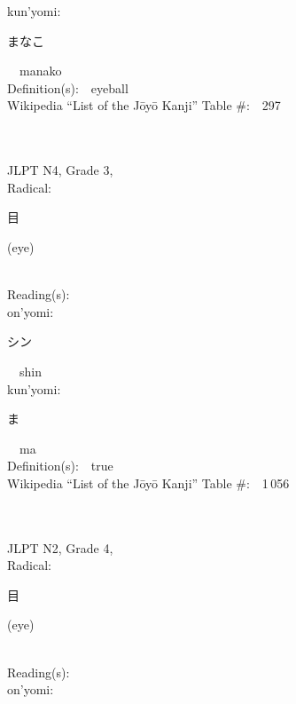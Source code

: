 \begin{multicols}{2}
{\hspace*{1em}}kun'yomi:\ \ \\
{\hspace*{2em}}{\begin{CJK}{UTF8}{min} まなこ \end{CJK}}\ \ manako\ \ \\
Definition(s):\ \ eyeball \\
Wikipedia ``List of the J\=oy\=o Kanji'' Table \#:\ \ 297 \\
\ \ \\
{\fontsize{34pt}{40pt}  }\ \ \\  %
{JLPT N4, Grade 3, \\Radical:\ \ {\begin{CJK}{UTF8}{min} 目 \end{CJK}} (eye) } \\
Reading(s):\ \ \\
{\hspace*{1em}}on'yomi:\ \ \\
{\hspace*{2em}}{\begin{CJK}{UTF8}{min} シン \end{CJK}}\ \ shin\ \ \\
{\hspace*{1em}}kun'yomi:\ \ \\
{\hspace*{2em}}{\begin{CJK}{UTF8}{min} ま \end{CJK}}\ \ ma\ \ \\
Definition(s):\ \ true \\
Wikipedia ``List of the J\=oy\=o Kanji'' Table \#:\ \ 1\,056 \\
\ \ \\
{\fontsize{34pt}{40pt}  }\ \ \\  %
{JLPT N2, Grade 4, \\Radical:\ \ {\begin{CJK}{UTF8}{min} 目 \end{CJK}} (eye) } \\
Reading(s):\ \ \\
{\hspace*{1em}}on'yomi:\ \ \\

\end{multicols}
